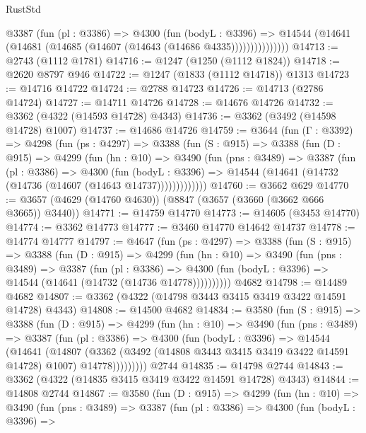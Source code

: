 \begin{lexlean}{RustStd}
\begin{coremodule}
                @3387
                  (fun (pl : @3386) =>
                  @4300
                    (fun (bodyL : @3396) =>
                    @14544 (@14641 (@14681 (@14685 (@14607 (@14643 (@14686 @4335)))))))))))))))
@14713 := @2743 (@1112 @1781)
@14716 := @1247 (@1250 (@1112 @1824))
@14718 := @2620 @8797 @946
@14722 := @1247 (@1833 (@1112 @14718)) @1313
@14723 := @14716 @14722
@14724 := @2788 @14723
@14726 := @14713 (@2786 @14724)
@14727 := @14711 @14726
@14728 := @14676 @14726
@14732 := @3362 (@4322 (@14593 @14728) @4343)
@14736 := @3362 (@3492 (@14598 @14728) @1007)
@14737 := @14686 @14726
@14759 := @3644
    (fun (Γ : @3392) =>
    @4298
      (fun (ps : @4297) =>
      @3388
        (fun (S : @915) =>
        @3388
          (fun (D : @915) =>
          @4299
            (fun (hn : @10) =>
            @3490
              (fun (pns : @3489) =>
              @3387
                (fun (pl : @3386) =>
                @4300
                  (fun (bodyL : @3396) =>
                  @14544 (@14641 (@14732 (@14736 (@14607 (@14643 @14737)))))))))))))
@14760 := @3662 @629
@14770 := @3657 (@4629 (@14760 @4630)) (@8847 (@3657 (@3660 (@3662 @666 @3665)) @3440))
@14771 := @14759 @14770
@14773 := @14605 (@3453 @14770)
@14774 := @3362 @14773
@14777 := @3460 @14770 @14642 @14737
@14778 := @14774 @14777
@14797 := @4647
    (fun (ps : @4297) =>
    @3388
      (fun (S : @915) =>
      @3388
        (fun (D : @915) =>
        @4299
          (fun (hn : @10) =>
          @3490
            (fun (pns : @3489) =>
            @3387
              (fun (pl : @3386) =>
              @4300 (fun (bodyL : @3396) => @14544 (@14641 (@14732 (@14736 @14778))))))))))
    @4682
@14798 := @14489 @4682
@14807 := @3362 (@4322 (@14798 @3443 @3415 @3419 @3422 @14591 @14728) @4343)
@14808 := @14500 @4682
@14834 := @3580
    (fun (S : @915) =>
    @3388
      (fun (D : @915) =>
      @4299
        (fun (hn : @10) =>
        @3490
          (fun (pns : @3489) =>
          @3387
            (fun (pl : @3386) =>
            @4300
              (fun (bodyL : @3396) =>
              @14544
                (@14641
                  (@14807
                    (@3362
                      (@3492 (@14808 @3443 @3415 @3419 @3422 @14591 @14728) @1007)
                      @14778)))))))))
    @2744
@14835 := @14798 @2744
@14843 := @3362 (@4322 (@14835 @3415 @3419 @3422 @14591 @14728) @4343)
@14844 := @14808 @2744
@14867 := @3580
    (fun (D : @915) =>
    @4299
      (fun (hn : @10) =>
      @3490
        (fun (pns : @3489) =>
        @3387
          (fun (pl : @3386) =>
          @4300
            (fun (bodyL : @3396) =>

\end{coremodule}
\end{lexlean}
